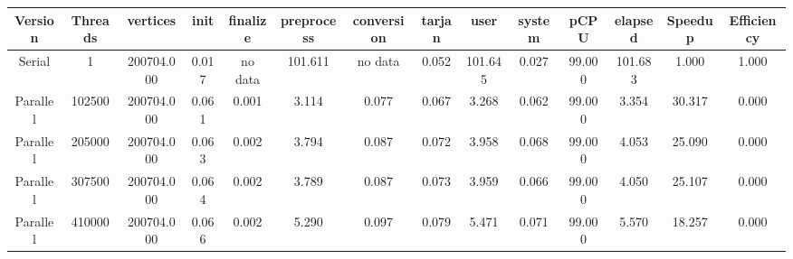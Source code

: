 \begin{tabular}{|c|c|c|c|c|c|c|c|c|c|c|c|c|c|}
\toprule
 Version &  Threads &   vertices &  init & finalize &  preprocess & conversion &  tarjan &    user &  system &   pCPU &  elapsed &  Speedup &  Efficiency \\
\midrule
  Serial &        1 & 200704.000 & 0.017 &  no data &     101.611 &    no data &   0.052 & 101.645 &   0.027 & 99.000 &  101.683 &    1.000 &       1.000 \\
Parallel &   102500 & 200704.000 & 0.061 &    0.001 &       3.114 &      0.077 &   0.067 &   3.268 &   0.062 & 99.000 &    3.354 &   30.317 &       0.000 \\
Parallel &   205000 & 200704.000 & 0.063 &    0.002 &       3.794 &      0.087 &   0.072 &   3.958 &   0.068 & 99.000 &    4.053 &   25.090 &       0.000 \\
Parallel &   307500 & 200704.000 & 0.064 &    0.002 &       3.789 &      0.087 &   0.073 &   3.959 &   0.066 & 99.000 &    4.050 &   25.107 &       0.000 \\
Parallel &   410000 & 200704.000 & 0.066 &    0.002 &       5.290 &      0.097 &   0.079 &   5.471 &   0.071 & 99.000 &    5.570 &   18.257 &       0.000 \\
\bottomrule
\end{tabular}
